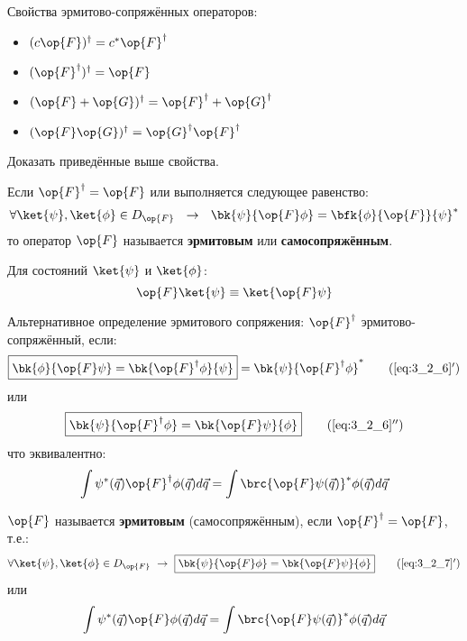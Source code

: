 Свойства эрмитово-сопряжённых операторов:
\begin{itemize}
\item $(c\op{F})^\dag = c^* \op{F}^\dag$
\item $(\op{F}^\dag)^\dag = \op{F}$
\item $(\op{F} + \op{G})^\dag = \op{F}^\dag + \op{G}^\dag$
\item $(\op{F}\op{G})^\dag = \op{G}^\dag \op{F}^\dag$
\end{itemize}

\begin{excr}
Доказать приведённые выше свойства.
\end{excr}

\begin{defn}
Если $\op{F}^\dag = \op{F}$ или выполняется следующее равенство:
\begin{equation}
\label{eq:3_2_7}
\forall \ket{\psi},\ket{\phi} \in D_{\op{F}} ~~\to~~  \bk{\psi}{\op{F}\phi} = \bfk{\phi}{\op{F}}{\psi}^*
\end{equation}
то оператор $\op{F}$ называется \textbf{эрмитовым} или \textbf{самосопряжённым}.
\end{defn}

Для состояний $\ket{\psi}$ и $\ket{\phi}$:
$$
\op{F}\ket{\psi} \equiv \ket{\op{F}\psi}
$$

Альтернативное определение эрмитового сопряжения: $\op{F}^\dag$ эрмитово-сопряжённый, если:
\begin{equation}
\label{eq:3_2_6_add}
\boxed{
	\bk{\phi}{\op{F}\psi} = \bk{\op{F}^\dag\phi}{\psi}
} = \bk{\psi}{\op{F}^\dag \phi}^*
\tag{\ref{eq:3_2_6}$'$}
\end{equation}
или
\begin{equation}
\label{eq:3_2_6_add_x2}
\boxed{
	\bk{\psi}{\op{F}^\dag \phi} = \bk{\op{F} \psi}{\phi}
}
\tag{\ref{eq:3_2_6}$''$}
\end{equation}
что эквивалентно:
$$
\int \psi^*(\vec{q}) \op{F}^\dag \phi(\vec{q}) d\vec{q} = \int \brc{\op{F} \psi(\vec{q})}^* \phi(\vec{q}) d\vec{q}
$$

\begin{defn}
$\op{F}$ называется \textbf{эрмитовым} (самосопряжённым), если $\op{F}^\dag = \op{F}$, т.е.:
\begin{equation}
\label{eq:3_2_7_add}
\forall \ket{\psi}, \ket{\phi} \in D_{\op{F}}  ~\to~ \boxed{ \bk{\psi}{\op{F} \phi} = \bk{\op{F}\psi}{\phi} }
\tag{\ref{eq:3_2_7}$'$}
\end{equation}
или
$$
\int \psi^*(\vec{q}) \op{F} \phi(\vec{q}) d\vec{q} = \int \brc{\op{F} \psi(\vec{q})}^* \phi(\vec{q}) d\vec{q}
$$
\end{defn}

